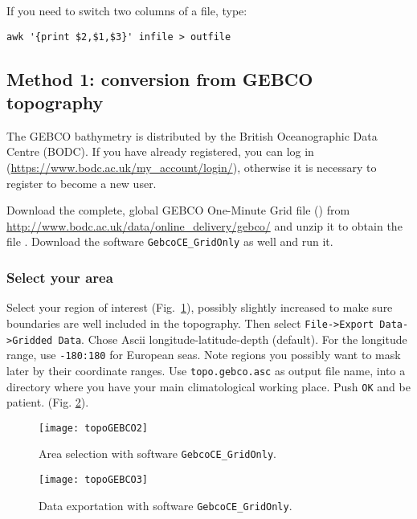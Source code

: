 If you need to switch two columns of a file, type:
\begin{verbatim}
awk '{print $2,$1,$3}' infile > outfile
\end{verbatim}
\etips



\subsection{Method 1: conversion from GEBCO topography\label{sec:topogebco}}

The GEBCO bathymetry is distributed by the British Oceanographic Data Centre (BODC). If you have already registered, you can log in (\url{https://www.bodc.ac.uk/my\_account/login/}), otherwise it is necessary to register to become a new user. 

Download the complete, global GEBCO One-Minute Grid file () from \url{http://www.bodc.ac.uk/data/online\_delivery/gebco/} and unzip it to obtain the file . Download the software \texttt{GebcoCE\_GridOnly} as well and run it. 

\subsubsection{Select your area}

Select your region of interest (Fig.~\ref{fig:gebco1}), possibly slightly increased to make sure boundaries are well included in the topography. Then select {\tt File->Export Data->Gridded Data}. Chose Ascii longitude-latitude-depth (default). For the longitude range, use {\tt -180:180} for European seas. Note regions you possibly want to mask later by their coordinate ranges.  Use {\tt topo.gebco.asc} as output file name, into a directory where
you have your main climatological working place. Push {\tt OK} and be patient. (Fig. \ref{fig:gebco2}). 

\begin{figure}[htpb]
\centering
\texttt{[image: topoGEBCO2]}
\caption{Area selection with software \texttt{GebcoCE\_GridOnly}.\label{fig:gebco1}}
\end{figure}


\begin{figure}[htpb]
\centering
\texttt{[image: topoGEBCO3]}
\caption{Data exportation with software \texttt{GebcoCE\_GridOnly}.\label{fig:gebco2}}
\end{figure}



